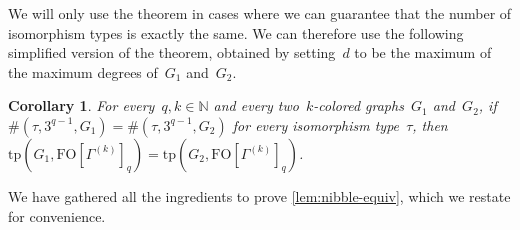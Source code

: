 \documentclass[11pt]{article}      \usepackage[margin=1in]{geometry}  \usepackage{microtype}
\newtheorem{corollary}[theorem]{Corollary}
\theoremstyle{definition}
\newcommand{\N}[0]{\mathrm{\mathbb{N}}}
\newcommand{\tp}{\mathrm{tp}}
\newcommand{\FO}{\mathrm{FO}}
\begin{document}
We will only use the theorem in cases where we can guarantee that the number of isomorphism types is exactly the same.
We can therefore use the following simplified version of the theorem, obtained by setting~$d$ to be the maximum of the maximum degrees of~$G_1$ and~$G_2$.

\begin{corollary}\label{cor:hanf}
    For every~$q,k\in \N$ and every two~$k$-colored graphs~$G_1$ and~$G_2$,
    if~$\#(\tau,3^{q-1},G_1) = \#(\tau,3^{q-1},G_2)$ for every isomorphism type~$\tau$, then~$\tp(G_1,\FO[\Gamma^{(k)}]_q) = \tp(G_2,\FO[\Gamma^{(k)}]_q)$.
\end{corollary}

We have gathered all the ingredients to prove \cref{lem:nibble-equiv}, which we restate for convenience.

\lemNibbleEquiv*
\end{document}
